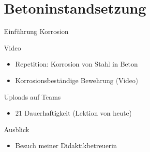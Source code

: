         \section{Betoninstandsetzung}
        \begin{frame}{Einführung Korrosion}
        \begin{block}{Video}
            \begin{itemize}
                \item [\textbullet] Repetition: Korrosion von  Stahl in Beton
                \item [\textbullet] Korrosionsbeständige Bewehrung (Video)
            \end{itemize}
        \end{block}
    \end{frame}





    \begin{frame}{Uploads auf Teams}
        \begin{itemize}
            \item[\textbullet] 21 Dauerhaftigkeit (Lektion von heute)
        \end{itemize}
        
    \end{frame}
    
    
        \begin{frame}{Ausblick}
        \begin{itemize}
            \item[\textbullet] Besuch meiner Didaktikbetreuerin
        \end{itemize}
        
    \end{frame}
    
    
    

        
    
    \folieFragen


    